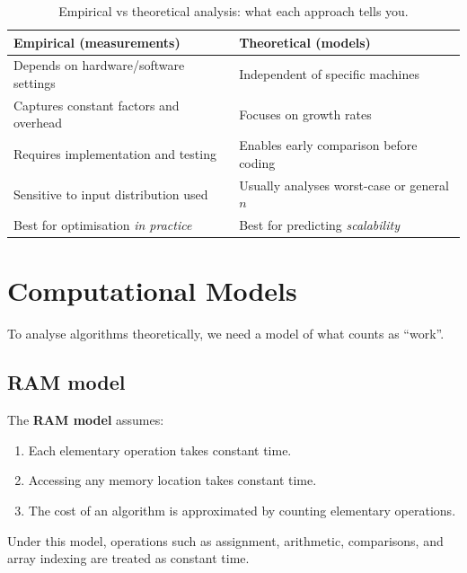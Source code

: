 \documentclass[12pt]{scrartcl}
\begin{document}
\begin{table}[h]
	\centering
	\caption{Empirical vs theoretical analysis: what each approach tells you.}
	\begin{tabular}{@{}p{} p{}@{}}
		\toprule
		Empirical (measurements)                 & Theoretical (models)                         \\ \midrule
		Depends on hardware/software settings    & Independent of specific machines             \\
		Captures constant factors and overhead   & Focuses on growth rates                      \\
		Requires implementation and testing      & Enables early comparison before coding       \\
		Sensitive to input distribution used     & Usually analyses worst-case or general \(n\) \\
		Best for optimisation \emph{in practice} & Best for predicting \emph{scalability}       \\
		\bottomrule
	\end{tabular}
\end{table}

\newpage
\section{Computational Models}
To analyse algorithms theoretically, we need a model of what counts as ``work''.

\subsection{RAM model}
The \textbf{RAM model} assumes:
\begin{enumerate}[leftmargin=1.5em]
	\item Each elementary operation takes constant time.
	\item Accessing any memory location takes constant time.
	\item The cost of an algorithm is approximated by counting elementary operations.
\end{enumerate}

Under this model, operations such as assignment, arithmetic, comparisons, and array indexing are treated as constant time.
\end{document}
